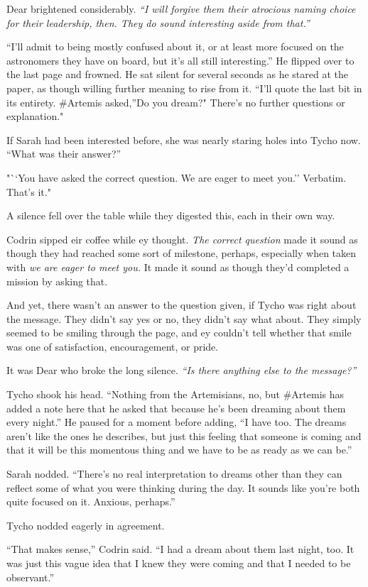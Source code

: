 Dear brightened considerably. \emph{``I will forgive them their atrocious naming choice for their leadership, then. They do sound interesting aside from that.''}

``I'll admit to being mostly confused about it, or at least more focused on the astronomers they have on board, but it's all still interesting.'' He flipped over to the last page and frowned. He sat silent for several seconds as he stared at the paper, as though willing further meaning to rise from it. ``I'll quote the last bit in its entirety. \#Artemis asked,''Do you dream?" There's no further questions or explanation."

If Sarah had been interested before, she was nearly staring holes into Tycho now. ``What was their answer?''

"``You have asked the correct question. We are eager to meet you.'' Verbatim. That's it."

A silence fell over the table while they digested this, each in their own way.

Codrin sipped eir coffee while ey thought. \emph{The correct question} made it sound as though they had reached some sort of milestone, perhaps, especially when taken with \emph{we are eager to meet you.} It made it sound as though they'd completed a mission by asking that.

And yet, there wasn't an answer to the question given, if Tycho was right about the message. They didn't say yes or no, they didn't say what about. They simply seemed to be smiling through the page, and ey couldn't tell whether that smile was one of satisfaction, encouragement, or pride.

It was Dear who broke the long silence. \emph{``Is there anything else to the message?''}

Tycho shook his head. ``Nothing from the Artemisians, no, but \#Artemis has added a note here that he asked that because he's been dreaming about them every night.'' He paused for a moment before adding, ``I have too. The dreams aren't like the ones he describes, but just this feeling that someone is coming and that it will be this momentous thing and we have to be as ready as we can be.''

Sarah nodded. ``There's no real interpretation to dreams other than they can reflect some of what you were thinking during the day. It sounds like you're both quite focused on it. Anxious, perhaps.''

Tycho nodded eagerly in agreement.

``That makes sense,'' Codrin said. ``I had a dream about them last night, too. It was just this vague idea that I knew they were coming and that I needed to be observant.''

